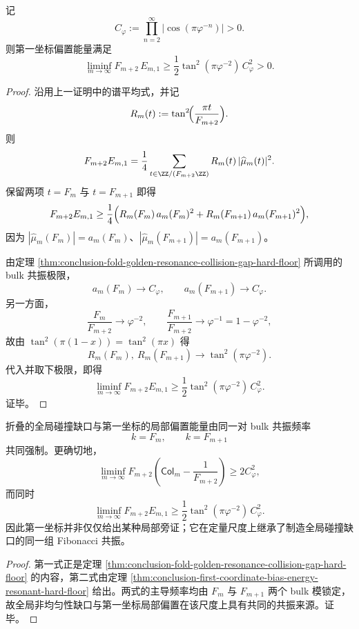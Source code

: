 \begin{theorem}[第一坐标偏置能量的共振硬下界]\label{thm:conclusion-first-coordinate-bias-energy-resonant-hard-floor}
记
\[
C_\varphi:=\prod_{n=2}^{\infty}\bigl|\cos(\pi\varphi^{-n})\bigr|>0.
\]
则第一坐标偏置能量满足
\[
\liminf_{m\to\infty}F_{m+2}\,E_{m,1}
\ge
\frac12\tan^2(\pi\varphi^{-2})\,C_\varphi^2
>0.
\]
\end{theorem}
\begin{proof}
沿用上一证明中的谱平均式，并记
\[
R_m(t):=\tan^2\!\Bigl(\frac{\pi t}{F_{m+2}}\Bigr).
\]
则
\[
F_{m+2}E_{m,1}
=
\frac14\sum_{t\in\ZZ/(F_{m+2}\ZZ)}R_m(t)\,|\widehat\mu_m(t)|^2.
\]
保留两项 \(t=F_m\) 与 \(t=F_{m+1}\) 即得
\[
F_{m+2}E_{m,1}
\ge
\frac14\Bigl(
R_m(F_m)\,a_m(F_m)^2
+
R_m(F_{m+1})\,a_m(F_{m+1})^2
\Bigr),
\]
因为 \(|\widehat\mu_m(F_m)|=a_m(F_m)\)、\(|\widehat\mu_m(F_{m+1})|=a_m(F_{m+1})\)。

由定理 \ref{thm:conclusion-fold-golden-resonance-collision-gap-hard-floor} 所调用的 bulk 共振极限，
\[
a_m(F_m)\longrightarrow C_\varphi,
\qquad
a_m(F_{m+1})\longrightarrow C_\varphi.
\]
另一方面，
\[
\frac{F_m}{F_{m+2}}\longrightarrow \varphi^{-2},
\qquad
\frac{F_{m+1}}{F_{m+2}}\longrightarrow \varphi^{-1}=1-\varphi^{-2},
\]
故由 \(\tan^2(\pi(1-x))=\tan^2(\pi x)\) 得
\[
R_m(F_m),\ R_m(F_{m+1})\longrightarrow \tan^2(\pi\varphi^{-2}).
\]
代入并取下极限，即得
\[
\liminf_{m\to\infty}F_{m+2}E_{m,1}
\ge
\frac12\tan^2(\pi\varphi^{-2})\,C_\varphi^2.
\]
证毕。
\end{proof}

\begin{corollary}[全局碰撞缺口与第一坐标偏置的同源共振强制]\label{cor:conclusion-first-coordinate-bias-and-global-gap-common-resonant-origin}
折叠的全局碰撞缺口与第一坐标的局部偏置能量由同一对 bulk 共振频率
\[
k=F_m,
\qquad
k=F_{m+1}
\]
共同强制。更确切地，
\[
\liminf_{m\to\infty}F_{m+2}\left(\mathsf{Col}_m-\frac{1}{F_{m+2}}\right)\ge 2C_\varphi^2,
\]
而同时
\[
\liminf_{m\to\infty}F_{m+2}E_{m,1}
\ge
\frac12\tan^2(\pi\varphi^{-2})\,C_\varphi^2.
\]
因此第一坐标并非仅仅给出某种局部旁证；它在定量尺度上继承了制造全局碰撞缺口的同一组 Fibonacci 共振。
\end{corollary}
\begin{proof}
第一式正是定理 \ref{thm:conclusion-fold-golden-resonance-collision-gap-hard-floor} 的内容，第二式由定理 \ref{thm:conclusion-first-coordinate-bias-energy-resonant-hard-floor} 给出。两式的主导频率均由 \(F_m\) 与 \(F_{m+1}\) 两个 bulk 模锁定，故全局非均匀性缺口与第一坐标局部偏置在该尺度上具有共同的共振来源。证毕。
\end{proof}

